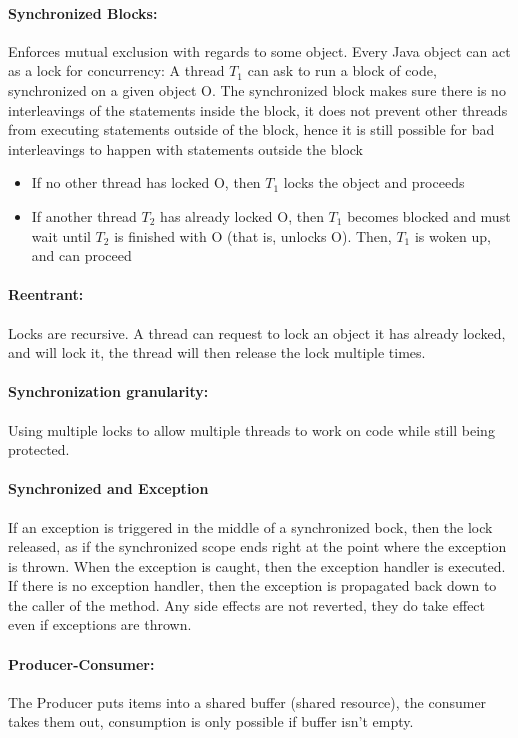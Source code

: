 \documentclass[8pt]{extreport}
\begin{document}
\paragraph{Synchronized Blocks: } Enforces mutual exclusion with regards to some object. Every Java object can act as a lock for concurrency: A thread $T_{1}$ can ask to run a block of code, synchronized on a given object O. The synchronized block makes sure there is no interleavings of the statements inside the block, it does not prevent other threads from executing statements outside of the block, hence it is still possible for bad interleavings to happen with statements outside the block
\begin{itemize}
\item If no other thread has locked O, then $T_{1}$ locks the object and proceeds
\item If another thread $T_{2}$ has already locked O, then $T_{1}$ becomes blocked and must wait until $T_{2}$ is finished with O (that is, unlocks O). Then, $T_{1}$ is woken up, and can proceed 
\end{itemize}
\paragraph{Reentrant: } Locks are recursive. A thread can request to lock an object it has already locked, and will lock it, the thread will then release the lock multiple times.
\paragraph{Synchronization granularity: } Using multiple locks to allow multiple threads to work on code while still being protected.
\paragraph{Synchronized and Exception} If an exception is triggered in the middle of a synchronized bock, then the lock released, as if the synchronized scope ends right at the point where the exception is thrown. When the exception is caught, then the exception handler is executed. If there is no exception handler, then the exception is propagated back down to the caller of the method. Any side effects are not reverted, they do take effect even if exceptions are thrown.

\paragraph{Producer-Consumer: } The Producer puts items into a shared buffer (shared resource), the consumer takes them out, consumption is only possible if buffer isn't empty.
\end{document}
